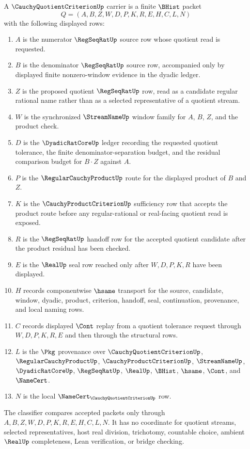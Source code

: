 \begin{definition}
\label{def:cauchy-quotient-criterion-carrier}
A $\CauchyQuotientCriterionUp$ carrier is a finite $\BHist$ packet
$$
Q=(A,B,Z,W,D,P,K,R,E,H,C,L,N)
$$
with the following displayed rows:
\begin{enumerate}
\item $A$ is the numerator $\RegSeqRatUp$ source row whose quotient read is requested.
\item $B$ is the denominator $\RegSeqRatUp$ source row, accompanied only by displayed finite nonzero-window evidence in the dyadic ledger.
\item $Z$ is the proposed quotient $\RegSeqRatUp$ row, read as a candidate regular rational name rather than as a selected representative of a quotient stream.
\item $W$ is the synchronized $\StreamNameUp$ window family for $A$, $B$, $Z$, and the product check.
\item $D$ is the $\DyadicRatCoreUp$ ledger recording the requested quotient tolerance, the finite denominator-separation budget, and the residual comparison budget for $B\cdot Z$ against $A$.
\item $P$ is the $\RegularCauchyProductUp$ route for the displayed product of $B$ and $Z$.
\item $K$ is the $\CauchyProductCriterionUp$ sufficiency row that accepts the product route before any regular-rational or real-facing quotient read is exposed.
\item $R$ is the $\RegSeqRatUp$ handoff row for the accepted quotient candidate after the product residual has been checked.
\item $E$ is the $\RealUp$ seal row reached only after $W,D,P,K,R$ have been displayed.
\item $H$ records componentwise $\hsame$ transport for the source, candidate, window, dyadic, product, criterion, handoff, seal, continuation, provenance, and local naming rows.
\item $C$ records displayed $\Cont$ replay from a quotient tolerance request through $W,D,P,K,R,E$ and then through the structural rows.
\item $L$ is the $\Pkg$ provenance over $\CauchyQuotientCriterionUp$, $\RegularCauchyProductUp$, $\CauchyProductCriterionUp$, $\StreamNameUp$, $\DyadicRatCoreUp$, $\RegSeqRatUp$, $\RealUp$, $\BHist$, $\hsame$, $\Cont$, and $\NameCert$.
\item $N$ is the local $\NameCert_{\CauchyQuotientCriterionUp}$ row.
\end{enumerate}
The classifier compares accepted packets only through $A,B,Z,W,D,P,K,R,E,H,C,L,N$. It has no coordinate for quotient streams, selected representatives, host real division, trichotomy, countable choice, ambient $\RealUp$ completeness, Lean verification, or bridge checking.
\end{definition}

